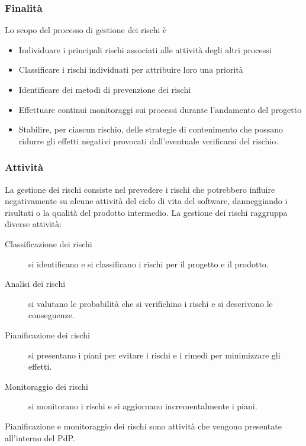 \documentclass[../../norme-di-progetto.tex]{subfiles}
\begin{document}
\subsubsection{Finalità}%
\label{subs:gestione_dei_rischi/finalita}
Lo scopo del processo di gestione dei rischi è
\begin{itemize}
  \item Individuare i principali rischi associati alle attività degli altri processi
  \item Classificare i rischi individuati per attribuire loro una priorità
  \item Identificare dei metodi di prevenzione dei rischi
  \item Effettuare continui monitoraggi sui processi durante l'andamento del progetto
  \item Stabilire, per ciascun rischio, delle strategie di contenimento che possano ridurre gli effetti negativi provocati dall'eventuale verificarsi del rischio.
\end{itemize}

\subsubsection{Attività}%
\label{subs:gestione_dei_rischi/attivita}
La gestione dei rischi consiste nel prevedere i rischi che potrebbero influire negativamente su alcune attività del ciclo di vita del software, danneggiando i risultati o la qualità del prodotto intermedio.
La gestione dei rischi raggruppa diverse attività:

\begin{description}
  \item [Classificazione dei rischi] si identificano e si classificano i rischi per il progetto e il prodotto.
  \item [Analisi dei rischi] si valutano le probabilità che si verifichino i rischi e si descrivono le conseguenze.
  \item [Pianificazione dei rischi] si presentano i piani per evitare i rischi e i rimedi per minimizzare gli effetti.
  \item [Monitoraggio dei rischi] si monitorano i rischi e si aggiornano incrementalmente i piani.
\end{description}

Pianificazione e monitoraggio dei rischi sono attività che vengono presentate all'interno del PdP.
\end{document}

